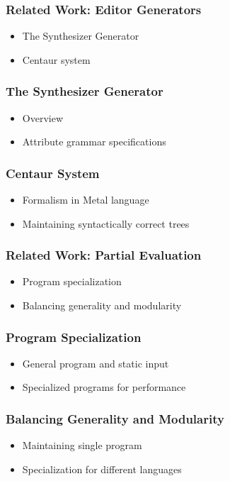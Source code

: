 \documentclass[t,24pt,aspectratio=169]{beamer}
\begin{document}
\begin{frame}[hvid]
    \frametitle{Related Work: Editor Generators}
    \begin{itemize}
        \item The Synthesizer Generator
        \item Centaur system
    \end{itemize}
\end{frame}

\begin{frame}[hvid]
    \frametitle{The Synthesizer Generator}
    \begin{itemize}
        \item Overview
        \item Attribute grammar specifications
    \end{itemize}
\end{frame}

\begin{frame}[hvid]
    \frametitle{Centaur System}
    \begin{itemize}
        \item Formalism in Metal language
        \item Maintaining syntactically correct trees
    \end{itemize}
\end{frame}

\begin{frame}[hvid]
    \frametitle{Related Work: Partial Evaluation}
    \begin{itemize}
        \item Program specialization
        \item Balancing generality and modularity
    \end{itemize}
\end{frame}

\begin{frame}[hvid]
    \frametitle{Program Specialization}
    \begin{itemize}
        \item General program and static input
        \item Specialized programs for performance
    \end{itemize}
\end{frame}

\begin{frame}[hvid]
    \frametitle{Balancing Generality and Modularity}
    \begin{itemize}
        \item Maintaining single program
        \item Specialization for different languages
    \end{itemize}
\end{frame}
\end{document}

